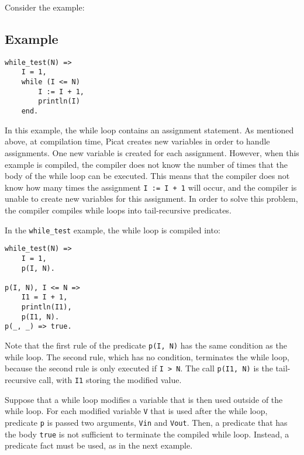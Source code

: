 Consider the example:
\subsection*{Example}
\begin{verbatim}
while_test(N) =>
    I = 1,
    while (I <= N)
        I := I + 1,
        println(I)
    end.
\end{verbatim}
In this example, the while loop contains an assignment statement.  As mentioned above, at compilation time, Picat creates new variables in order to handle assignments.  One new variable is created for each assignment.  However, when this example is compiled, the compiler does not know the number of times that the body of the while loop can be executed.  This means that the compiler does not know how many times the assignment \texttt{I := I + 1} will occur, and the compiler is unable to create new variables for this assignment.  In order to solve this problem, the compiler compiles while loops into tail-recursive predicates.

In the \texttt{while\_test} example, the while loop is compiled into:
\begin{verbatim}
while_test(N) =>
    I = 1,
    p(I, N).

p(I, N), I <= N => 
    I1 = I + 1,
    println(I1),
    p(I1, N).
p(_, _) => true. 
\end{verbatim}

Note that the first rule of the predicate \texttt{p(I, N)} has the same condition as the while loop.  The second rule, which has no condition, terminates the while loop, because the second rule is only executed if \texttt{I > N}.  The call \texttt{p(I1, N)} is the tail-recursive call, with \texttt{I1} storing the modified value.

Suppose that a while loop modifies a variable that is then used outside of the while loop.   For each modified variable \texttt{V} that is used after the while loop, predicate \texttt{p} is passed two arguments, \texttt{Vin} and \texttt{Vout}.  Then, a predicate that has the body \texttt{true} is not sufficient to terminate the compiled while loop.  Instead, a predicate fact must be used, as in the next example.

